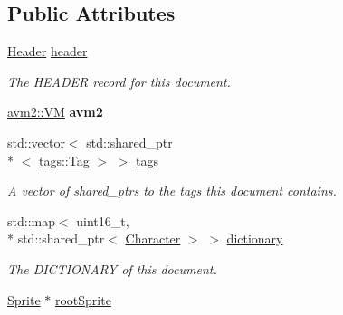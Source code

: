 \subsection*{Public Attributes}
\begin{DoxyCompactItemize}
\item 
\hypertarget{classjswf_1_1flash_1_1_document_ad72642b03597be4ad76a41d524d05913}{\hyperlink{structjswf_1_1flash_1_1_header}{Header} \hyperlink{classjswf_1_1flash_1_1_document_ad72642b03597be4ad76a41d524d05913}{header}}\label{classjswf_1_1flash_1_1_document_ad72642b03597be4ad76a41d524d05913}

\begin{DoxyCompactList}\small\item\em The {\ttfamily H\+E\+A\+D\+E\+R} record for this document. \end{DoxyCompactList}\item 
\hypertarget{classjswf_1_1flash_1_1_document_adaacad383fad582fe94a14c44782123f}{\hyperlink{classjswf_1_1avm2_1_1_v_m}{avm2\+::\+V\+M} {\bfseries avm2}}\label{classjswf_1_1flash_1_1_document_adaacad383fad582fe94a14c44782123f}

\item 
\hypertarget{classjswf_1_1flash_1_1_document_ac2c8471be7e7cde4660b4183c0f29bba}{std\+::vector$<$ std\+::shared\+\_\+ptr\\*
$<$ \hyperlink{classjswf_1_1flash_1_1tags_1_1_tag}{tags\+::\+Tag} $>$ $>$ \hyperlink{classjswf_1_1flash_1_1_document_ac2c8471be7e7cde4660b4183c0f29bba}{tags}}\label{classjswf_1_1flash_1_1_document_ac2c8471be7e7cde4660b4183c0f29bba}

\begin{DoxyCompactList}\small\item\em A {\ttfamily vector} of {\ttfamily shared\+\_\+ptr}s to the tags this document contains. \end{DoxyCompactList}\item 
\hypertarget{classjswf_1_1flash_1_1_document_aca1e9bbd368ff49f61d59a4fed7754a9}{std\+::map$<$ uint16\+\_\+t, \\*
std\+::shared\+\_\+ptr$<$ \hyperlink{classjswf_1_1flash_1_1_character}{Character} $>$ $>$ \hyperlink{classjswf_1_1flash_1_1_document_aca1e9bbd368ff49f61d59a4fed7754a9}{dictionary}}\label{classjswf_1_1flash_1_1_document_aca1e9bbd368ff49f61d59a4fed7754a9}

\begin{DoxyCompactList}\small\item\em The {\ttfamily D\+I\+C\+T\+I\+O\+N\+A\+R\+Y} of this document. \end{DoxyCompactList}\item 
\hyperlink{classjswf_1_1flash_1_1_sprite}{Sprite} $\ast$ \hyperlink{classjswf_1_1flash_1_1_document_a2b85a878280ace8647cb05fdfd79e22a}{root\+Sprite}
\end{DoxyCompactItemize}
